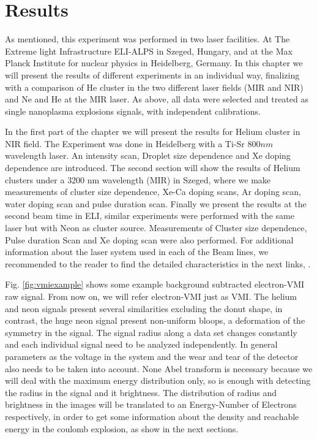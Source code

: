 
\chapter{Results}

As mentioned, this experiment was performed in two laser facilities. At The Extreme light Infrastructure ELI-ALPS in Szeged, Hungary, and at the Max Planck Institute for nuclear physics in Heidelberg, Germany. In this chapter we will present the results of different experiments in an individual way, finalizing with a comparison of He cluster in the two different laser fields (MIR and NIR) and Ne and He at the MIR laser. As above, all data were selected and treated as single nanoplasma explosions signals, with independent calibrations.

In the first part of the chapter we will present the results for Helium cluster in NIR field. The Experiment was done in Heidelberg with a Ti-Sr $800nm$ wavelength laser. An intensity scan, Droplet size dependence and Xe doping dependence are introduced. The second section will show the results of Helium clusters under a $3200$ nm wavelength (MIR) in Szeged, where we make measurements  of  cluster size dependence, Xe-Ca doping scans, Ar doping scan,  water doping scan and pulse duration scan. Finally we present the results at the second beam time in ELI, similar experiments were performed with the same laser but with Neon as cluster source. Measurements of Cluster size dependence, Pulse duration Scan and Xe doping scan were also performed. For additional information about the laser system used in each of the Beam lines, we recommended to the reader to find the detailed characteristics in the next links, \cite {thire_highly_2018}.

Fig. \ref{fig:vmiexample} shows some example background subtracted electron-VMI raw signal. From now on, we will refer electron-VMI just as VMI. The helium and neon signals present several similarities excluding the donut shape, in contrast, the huge neon signal present non-uniform bloops, a deformation of the symmetry in the signal. The signal radius along a data set changes constantly and each individual signal need to be analyzed independently. In general parameters as the voltage in the system and the wear and tear of the detector also needs to be taken into account. None Abel transform is necessary because we will deal with the maximum energy distribution only, so is enough with detecting the radius in the signal and it brightness. The distribution of radius and brightness in the images will be translated to an Energy-Number of Electrons respectively, in order to get some information about the density and reachable energy in the coulomb explosion, as show in the next sections.

